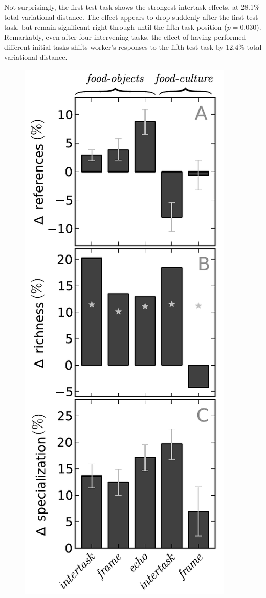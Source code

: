 \documentclass{sigchi}
\begin{document}
Not surprisingly, the first test task shows the strongest intertask 
effects, at 28.1\% total variational distance.  The effect appears to 
drop suddenly after the first test task, but remain significant 
right through until the fifth task position ($p=0.030$).
Remarkably, even after four intervening tasks, the effect of 
having performed different initial tasks shifts worker's responses to the
fifth test task by 12.4\% total variational distance.

\begin{figure}
	\centering
	\includegraphics[scale=0.87]{figs/vocab_specificity.pdf}

\end{figure}
\end{document}
